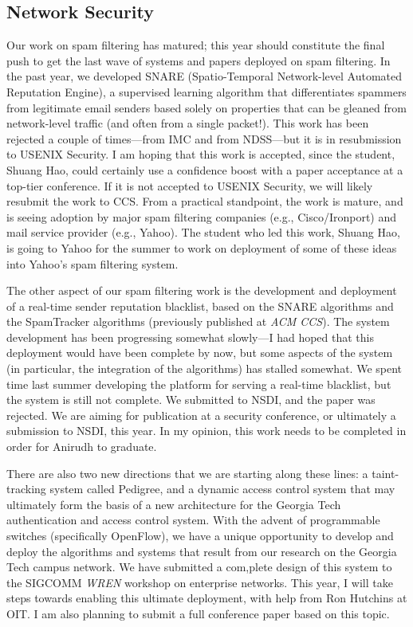 \begin{sloppypar}
\subsection*{Network Security}

Our work on spam filtering has matured; this year should constitute the
final push to get the last wave of systems and papers deployed on spam
filtering.  In the past year, we developed SNARE (Spatio-Temporal
Network-level Automated Reputation Engine), a supervised learning
algorithm that differentiates spammers from legitimate email senders
based solely on properties that can be gleaned from network-level
traffic (and often from a single packet!).  This work has been rejected
a couple of times---from IMC and from NDSS---but it is in resubmission
to USENIX Security.  I am hoping that this work is accepted, since the
student, Shuang Hao, could certainly use a confidence boost with a paper
acceptance at a top-tier conference.  If it is not accepted to USENIX
Security, we will likely resubmit the work to CCS.  From a practical
standpoint, the work is mature, and is seeing adoption by major spam
filtering companies (e.g., Cisco/Ironport) and mail service provider
(e.g., Yahoo).  The student who led this work, Shuang Hao, is going to
Yahoo for the summer to work on deployment of some of these ideas into
Yahoo's spam filtering system.

The other aspect of our spam filtering work is the development and
deployment of a real-time sender reputation blacklist, based on the
SNARE algorithms and the SpamTracker algorithms (previously published at
{\em ACM CCS}).  The system development has been progressing somewhat
slowly---I had hoped that this deployment would have been complete by
now, but some aspects of the system (in particular, the integration of
the algorithms) has stalled somewhat.  We spent time last summer
developing the platform for serving a real-time blacklist, but the
system is still not complete.  We submitted to NSDI, and the paper was
rejected. We are aiming for publication at a security conference, or
ultimately a submission to NSDI, this year.  In my opinion, this work
needs to be completed in order for Anirudh to graduate.

There are also two new directions that we are starting along these
lines: a taint-tracking system called Pedigree, and a dynamic access
control system that may ultimately form the basis of a new architecture
for the Georgia Tech authentication and access control system.  With the
advent of programmable switches (specifically OpenFlow), we have a
unique opportunity to develop and deploy the algorithms and systems that
result from our research on the Georgia Tech campus network.  We have
submitted a com,plete design of this system to the SIGCOMM {\em WREN}
workshop on enterprise networks.  This year, I will take steps towards
enabling this ultimate deployment, with help from Ron Hutchins at OIT.
I am also planning to submit a full conference paper based on this
topic.


\end{sloppypar}
